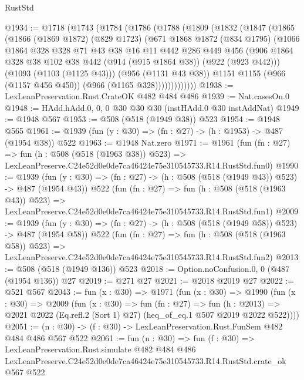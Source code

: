 \begin{lexlean}{RustStd}
\begin{coremodule}
@1934 := @1718
    (@1743
      (@1784
        (@1786
          (@1788
            (@1809
              (@1832
                (@1847
                  (@1865
                    (@1866
                      (@1869 @1872)
                      (@829 @1723)
                      (@671
                        @1868
                        @1872
                        (@834 @1795)
                        (@1066
                          @1864
                          @328
                          @328
                          @71
                          @43
                          @38
                          @16
                          @11
                          @442
                          @286
                          @449
                          @456
                          (@906
                            @1864
                            @328
                            @38
                            @102
                            @38
                            @442
                            (@914 (@915 @1864 @38))
                            (@922 (@923 @442)))
                          (@1093 (@1103 (@1125 @43)))
                          (@956 (@1131 @43 @38))
                          @1151
                          @1155
                          (@966 (@1157 @456 @450))
                          (@966 (@1165 @328)))))))))))))
@1938 := LexLeanPreservation.Rust.CrateOK @482 @484 @486
@1939 := Nat.casesOn.{0}
@1948 := HAdd.hAdd.{0, 0, 0} @30 @30 @30 (instHAdd.{0} @30 instAddNat)
@1949 := @1948 @567
@1953 := @508 (@518 (@1949 @38)) @523
@1954 := @1948 @565
@1961 := @1939 (fun (y : @30) => (fn : @27) -> (h : @1953) -> @487 (@1954 @38)) @522
@1963 := @1948 Nat.zero
@1971 := @1961
    (fun (fn : @27) =>
    fun (h : @508 (@518 (@1963 @38)) @523) =>
    LexLeanPreserve.C24e52d0e0de7ca46424e75e310545733.R14.RustStd.fun0)
@1990 := @1939
    (fun (y : @30) => (fn : @27) -> (h : @508 (@518 (@1949 @43)) @523) -> @487 (@1954 @43))
    @522
    (fun (fn : @27) =>
    fun (h : @508 (@518 (@1963 @43)) @523) =>
    LexLeanPreserve.C24e52d0e0de7ca46424e75e310545733.R14.RustStd.fun1)
@2009 := @1939
    (fun (y : @30) => (fn : @27) -> (h : @508 (@518 (@1949 @58)) @523) -> @487 (@1954 @58))
    @522
    (fun (fn : @27) =>
    fun (h : @508 (@518 (@1963 @58)) @523) =>
    LexLeanPreserve.C24e52d0e0de7ca46424e75e310545733.R14.RustStd.fun2)
@2013 := @508 (@518 (@1949 @136)) @523
@2018 := Option.noConfusion.{0, 0} (@487 (@1954 @136)) @27
@2019 := @271 @27
@2021 := @2018 @2019 @27
@2022 := @521 @567
@2043 := fun (x : @30) =>
  @1971
    (fun (x : @30) =>
    @1990
      (fun (x : @30) =>
      @2009
        (fun (x : @30) =>
        fun (fn : @27) =>
        fun (h : @2013) =>
        @2021 @2022 (Eq.refl.{2} (Sort 1) @27) (heq_of_eq.{1} @507 @2019 @2022 @522))))
@2051 := (n : @30) -> (f : @30) -> LexLeanPreservation.Rust.FunSem @482 @484 @486 @567 @522
@2061 := fun (n : @30) =>
  fun (f : @30) =>
  LexLeanPreservation.Rust.simulate
    @482
    @484
    @486
    LexLeanPreserve.C24e52d0e0de7ca46424e75e310545733.R14.RustStd.crate_ok
    @567
    @522
\end{coremodule}
\end{lexlean}
